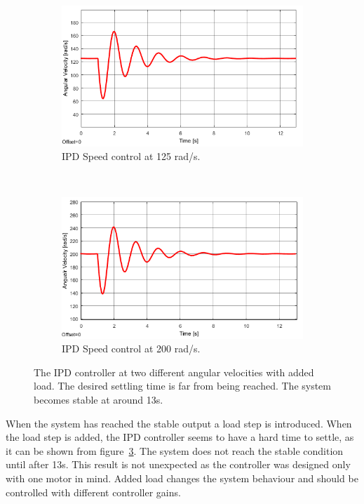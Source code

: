 \begin{figure}[h!]
	\centering
	\begin{subfigure}[b]{0.45\textwidth}
		\includegraphics[width=\textwidth]{graphics/IPD_load125}
		\caption{IPD Speed control at 125 rad/s.}
		\label{fig:ipdload125}
	\end{subfigure}
	~ %
	\begin{subfigure}[b]{0.45\textwidth}
		\includegraphics[width=\textwidth]{graphics/IPD_load200}
		\caption{IPD Speed control at 200 rad/s.}
		\label{fig:ipdload200}
	\end{subfigure}
	\caption{The IPD controller at two different angular velocities with added load. The desired settling time is far from being reached. The system becomes stable at around 13s.}
	\label{fig:ipdload}
\end{figure}

When the system has reached the stable output a load step is introduced.
When the load step is added, the IPD controller seems to have a hard time to settle, as it can be shown from figure~\ref{fig:ipdload}. The system does not reach the stable condition until after 13s.
This result is not unexpected as the controller was designed only with one motor in mind.
Added load changes the system behaviour and should be controlled with different controller gains.
